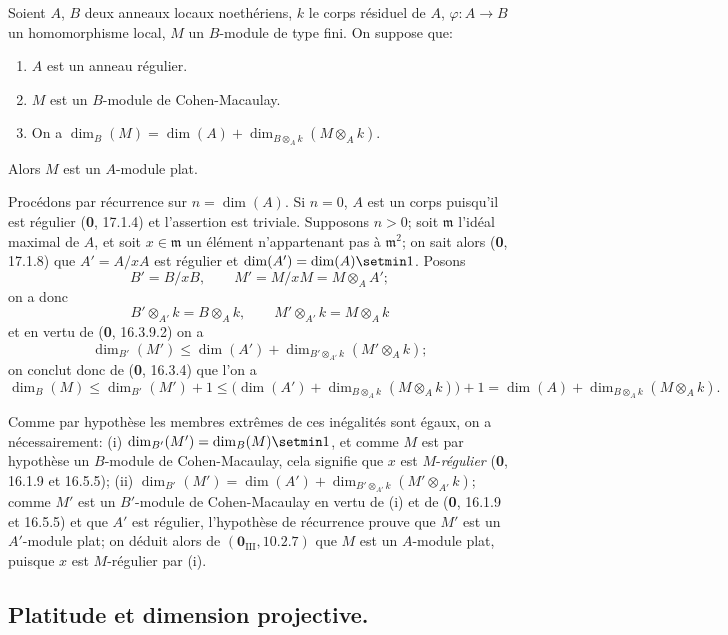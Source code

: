\begin{proposition}[6.1.5]
Soient $A$, $B$ deux anneaux locaux noethériens, $k$ le corps résiduel de
$A$, $\varphi:A\to B$ un homomorphisme local, $M$ un $B$-module de type fini.
On suppose que:
\begin{enumerate}
\item[\textup{1\textsuperscript{o}}] $A$ est un anneau régulier.
\item[\textup{2\textsuperscript{o}}] $M$ est un $B$-module de Cohen-Macaulay.
\item[\textup{3\textsuperscript{o}}] On a
$\dim_B(M)=\dim(A)+\dim_{B\otimes_Ak}(M\otimes_Ak)$.
\end{enumerate}

Alors $M$ est un $A$-module plat.
\end{proposition}

Procédons par récurrence sur $n=\dim(A)$. Si $n=0$, $A$ est un corps
puisqu'il est régulier (\textbf{0}, 17.1.4) et l'assertion est triviale. Supposons
$n>0$; soit $\mathfrak m$ l'idéal maximal de $A$, et soit
$x\in\mathfrak m$ un élément n'appartenant pas à $\mathfrak m^2$; on sait
alors (\textbf{0}, 17.1.8) que $A'=A/xA$ est régulier et
$\dim(A')=\dim(A)\setmin 1$. Posons
\[
B'=B/xB,\qquad M'=M/xM=M\otimes_AA';
\]
on a donc
\[
B'\otimes_{A'}k=B\otimes_Ak,\qquad
M'\otimes_{A'}k=M\otimes_Ak
\]
et en vertu de (\textbf{0}, 16.3.9.2) on a
\[
\dim_{B'}(M')\leq\dim(A')+
\dim_{B'\otimes_{A'}k}(M'\otimes_Ak);
\]
on conclut donc de (\textbf{0}, 16.3.4) que l'on a
\[
\dim_B(M)\leq\dim_{B'}(M')+1
\leq\bigl(\dim(A')+
\dim_{B\otimes_Ak}(M\otimes_Ak)\bigr)+1
=\dim(A)+\dim_{B\otimes_Ak}(M\otimes_Ak).
\]

Comme par hypothèse les membres extrêmes de ces inégalités sont égaux, on
a nécessairement: (i) $\dim_{B'}(M')=\dim_B(M)\setmin 1$, et comme $M$ est par
hypothèse un $B$-module de Cohen-Macaulay, cela signifie que $x$ est
$M$-\emph{régulier} (\textbf{0}, 16.1.9 et 16.5.5); (ii)
$\dim_{B'}(M')=\dim(A')+
\dim_{B'\otimes_{A'}k}(M'\otimes_{A'}k)$; comme $M'$ est un $B'$-module de
Cohen-Macaulay en vertu de (i) et de (\textbf{0}, 16.1.9 et 16.5.5) et que $A'$ est
régulier, l'hypothèse de récurrence prouve que $M'$ est un $A'$-module plat;
on déduit alors de $(\mathbf{0}_{\mathrm{III}}, 10.2.7)$ que $M$ est un $A$-module
plat, puisque $x$ est $M$-régulier par (i).

\subsection{Platitude et dimension projective.}

